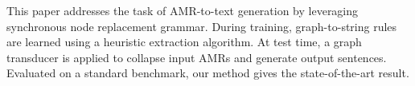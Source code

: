 This paper addresses the task of AMR-to-text generation by leveraging synchronous node replacement grammar. During training, graph-to-string rules are learned using a heuristic extraction algorithm. At test time, a graph transducer is applied to collapse input AMRs and generate output sentences. Evaluated on a standard benchmark, our method gives the state-of-the-art result.
